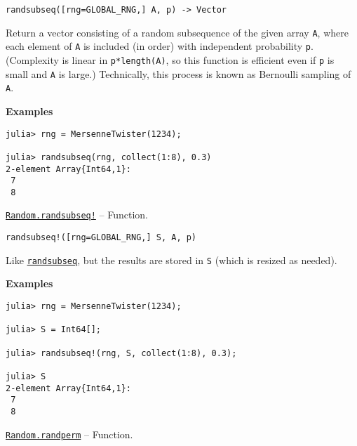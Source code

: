 \begin{adjustwidth}{2em}{0pt}


\begin{verbatim}
randsubseq([rng=GLOBAL_RNG,] A, p) -> Vector
\end{verbatim}

Return a vector consisting of a random subsequence of the given array \texttt{A}, where each element of \texttt{A} is included (in order) with independent probability \texttt{p}. (Complexity is linear in \texttt{p*length(A)}, so this function is efficient even if \texttt{p} is small and \texttt{A} is large.) Technically, this process is known as {\textquotedbl}Bernoulli sampling{\textquotedbl} of \texttt{A}.

\textbf{Examples}


\begin{verbatim}
julia> rng = MersenneTwister(1234);

julia> randsubseq(rng, collect(1:8), 0.3)
2-element Array{Int64,1}:
 7
 8
\end{verbatim}



\end{adjustwidth}
\hypertarget{16120735695998231549}{} 
\hyperlink{16120735695998231549}{\texttt{Random.randsubseq!}}  -- {Function.}

\begin{adjustwidth}{2em}{0pt}


\begin{verbatim}
randsubseq!([rng=GLOBAL_RNG,] S, A, p)
\end{verbatim}

Like \hyperlink{10454370655022505544}{\texttt{randsubseq}}, but the results are stored in \texttt{S} (which is resized as needed).

\textbf{Examples}


\begin{verbatim}
julia> rng = MersenneTwister(1234);

julia> S = Int64[];

julia> randsubseq!(rng, S, collect(1:8), 0.3);

julia> S
2-element Array{Int64,1}:
 7
 8
\end{verbatim}



\end{adjustwidth}
\hypertarget{7342203624124611352}{} 
\hyperlink{7342203624124611352}{\texttt{Random.randperm}}  -- {Function.}

